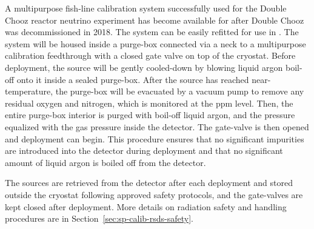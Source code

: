 A multipurpose fish-line calibration
system successfully used
 for the Double Chooz
reactor neutrino experiment has become available for  after
Double Chooz was decommissioned in 2018. The system can be
easily refitted for use in . The system will be housed inside
a purge-box connected via a neck to a multipurpose
calibration feedthrough  with a closed gate valve on top of the
cryostat. Before deployment, the source will be gently cooled-down by blowing liquid argon boil-off onto it inside a sealed purge-box. After the source has reached 
near- temperature, the purge-box will be evacuated by a vacuum pump to remove any residual oxygen and nitrogen, which is monitored at the ppm level. Then, the entire purge-box interior is purged with boil-off liquid argon, and the pressure equalized with the gas pressure inside the detector. The gate-valve is then opened and deployment can begin. This procedure ensures that no significant impurities are introduced into the detector during deployment and that no significant amount of liquid argon is boiled off from the detector. 

The sources are retrieved from the
detector after each deployment and stored outside the cryostat following approved safety protocols, and the gate-valves are kept closed after deployment. More details on radiation safety and handling procedures are in Section~\ref{sec:sp-calib-rsds-safety}.

